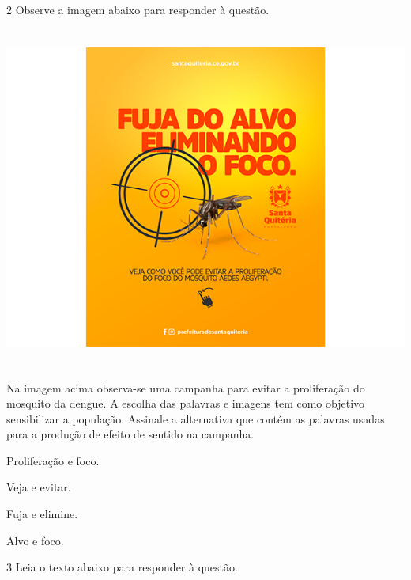 \num{2} Observe a imagem abaixo para responder à questão. 

\includegraphics[width=5.90551in,height=4.43056in]{./imgSAEB_7_POR/media/image6.png}


Na imagem acima observa-se uma campanha para evitar a proliferação do
mosquito da dengue. A escolha das palavras e imagens tem como objetivo
sensibilizar a população. Assinale a alternativa que contém as palavras
usadas para a produção de efeito de sentido na campanha. 

\begin{escolha}
  
  \item Proliferação e foco.
  
  \item Veja e evitar.
  
  \item Fuja e elimine.
  
  \item Alvo e foco. 

\end{escolha}

\num{3} Leia o texto abaixo para responder à questão.


